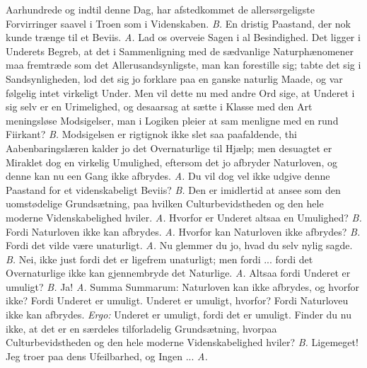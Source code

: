 \documentclass[12pt,a4paper]{book}
\begin{document}
Aarhundrede og indtil denne Dag, har afstedkommet de allersørgeligste
Forvirringer saavel i Troen som i Videnskaben. \textit{B.} En dristig Paastand,
der nok kunde trænge til et Beviis. \textit{A.} Lad os overveie Sagen i al
Besindighed. Det ligger i Underets Begreb, at det i Sammenligning med de
sædvanlige Naturphænomener maa fremtræde som det Allerusandsynligste, man kan
forestille sig; tabte det sig i Sandsynligheden, lod det sig jo forklare paa en
ganske naturlig Maade, og var følgelig intet virkeligt Under. Men vil dette nu
med andre Ord sige, at Underet i sig selv er en Urimelighed, og desaarsag at
sætte i Klasse med den Art meningsløse Modsigelser, man i Logiken pleier at
sam\-%
menligne med en rund Fiirkant? \textit{B.} Modsigelsen er rigtignok ikke slet
saa paafaldende, thi Aabenbaringslæren kalder jo det Overnaturlige til Hjælp;
men desuagtet er Miraklet dog en virkelig Umulighed, eftersom det jo afbryder
Naturloven, og denne kan nu een Gang ikke afbrydes. \textit{A.} Du vil dog vel
ikke udgive denne Paastand for et videnskabeligt Beviis? \textit{B.} Den er
imidlertid at ansee som den uomstødelige Grundsætning, paa hvilken
Culturbevidstheden og den hele moderne Videnskabelighed hviler. \textit{A.}
Hvorfor er Underet altsaa en Umulighed? \textit{B.} Fordi Naturloven ikke kan
afbrydes. \textit{A.} Hvorfor kan Naturloven ikke afbrydes? \textit{B.} Fordi
det vilde være unaturligt. \textit{A.} Nu glemmer du jo, hvad du selv nylig
sagde. \textit{B.} Nei, ikke just fordi det er ligefrem unaturligt; men fordi
... fordi det Overnaturlige ikke kan gjennembryde det Naturlige. \textit{A.}
Altsaa fordi Underet er umuligt? \textit{B.} Ja! \textit{A.} Summa Summarum:
Naturloven kan ikke afbrydes, og hvorfor ikke? Fordi Underet er umuligt. Underet
er umuligt, hvorfor? Fordi
Naturloveu ikke kan afbrydes. \textit{Ergo:} Underet er umuligt, fordi det er
umuligt. Finder du nu ikke, at det er en særdeles tilforladelig Grundsætning,
hvorpaa Culturbevidstheden og den hele moderne Videnskabelighed hviler?
\textit{B.} Ligemeget! Jeg troer paa dens Ufeilbarhed, og Ingen ... \textit{A.}
\end{document}
